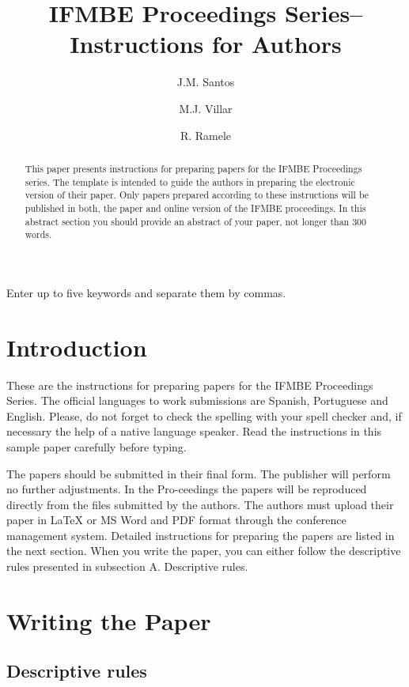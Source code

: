 \documentclass[nouppercase]{ifmbe}
\title{IFMBE Proceedings Series-- Instructions for Authors}
\affiliation{Institution/Department, Affiliation, City, Country }{FIRSTAFF}
\affiliation{Institution/Department, Affiliation, City, Country }{SECONDAFF}
\author{J.M. Santos}{FIRSTAFF}
\author{M.J. Villar}{SECONDAFF}
\author{R. Ramele}{FIRSTAFF}
\begin{document}
\maketitle

\begin{abstract}
This paper presents instructions for preparing papers for the IFMBE 
Proceedings series. The template is intended to guide the authors in 
preparing the electronic version of their paper. Only papers prepared 
according to these instructions will be published in both, the paper 
and online version of the IFMBE proceedings. In this abstract section 
you should provide an abstract of your paper, not longer than 300 words.

\end{abstract}

\begin{keywords}
Enter up to five keywords and separate them by commas.
\end{keywords}

\section{Introduction}

These are the instructions for preparing papers for the IFMBE Proceedings Series. The official languages to work submissions are Spanish, Portuguese and English. Please, do not forget to check the spelling with your spell checker and, if necessary the help of a native language speaker. Read the instructions in this sample paper carefully before typing.

The papers should be submitted in their final form. The publisher will 
perform no further adjustments. In the Pro-ceedings the papers will be 
reproduced directly from the files submitted by the authors. The authors 
must upload their paper in LaTeX or MS Word and PDF format through the 
conference management system.
Detailed instructions for preparing the papers are listed in the next 
section. When you write the paper, you can either follow the descriptive
rules presented in subsection A. Descriptive rules.

\section{Writing the Paper}

\subsection{Descriptive rules}
\end{document}
